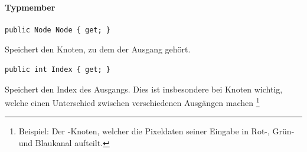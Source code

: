 \paragraph{Typmember}
\begin{itemize}

	\begin{verbatim}
public Node Node { get; }
	\end{verbatim}
Speichert den Knoten, zu dem der Ausgang gehört.

	\begin{verbatim}
public int Index { get; }
	\end{verbatim}
Speichert den Index des Ausgangs. Dies ist insbesondere bei Knoten wichtig, welche einen Unterschied zwischen verschiedenen Ausgängen machen \footnote{Beispiel: Der -Knoten, welcher die Pixeldaten seiner Eingabe in Rot-, Grün- und Blaukanal aufteilt.}

\end{itemize}

